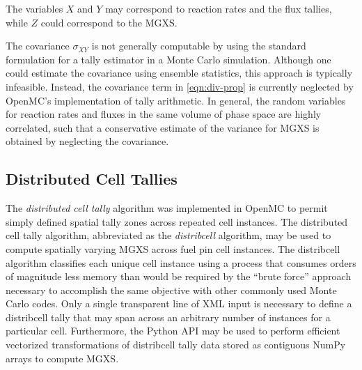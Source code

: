 \noindent The variables $X$ and $Y$ may correspond to reaction rates and the flux tallies, while $Z$ could correspond to the MGXS.

The covariance $\sigma_{XY}$ is not generally computable by using the standard formulation for a tally estimator in a Monte Carlo simulation. Although one could estimate the covariance using ensemble statistics, this approach is typically infeasible. Instead, the covariance term in \cref{eqn:div-prop} is currently neglected by OpenMC's implementation of tally arithmetic. In general, the random variables for reaction rates and fluxes in the same volume of phase space are highly correlated, such that a conservative estimate of the variance for MGXS is obtained by neglecting the covariance.

\subsection{Distributed Cell Tallies}
\label{subsec:distribcells}


The \emph{distributed cell tally} algorithm was implemented in OpenMC \cite{lax2014distribcell} to permit simply defined spatial tally zones across repeated cell instances. The distributed cell tally algorithm, abbreviated as the \emph{distribcell} algorithm, may be used to compute spatially varying MGXS across fuel pin cell instances. The distribcell algorithm classifies each unique cell instance using a process that consumes orders of magnitude less memory than would be required by the ``brute force'' approach necessary to accomplish the same objective with other commonly used Monte Carlo codes. Only a single transparent line of XML input is necessary to define a distribcell tally that may span across an arbitrary number of instances for a particular cell. Furthermore, the Python API may be used to perform efficient vectorized transformations of distribcell tally data stored as contiguous NumPy arrays to compute MGXS.
